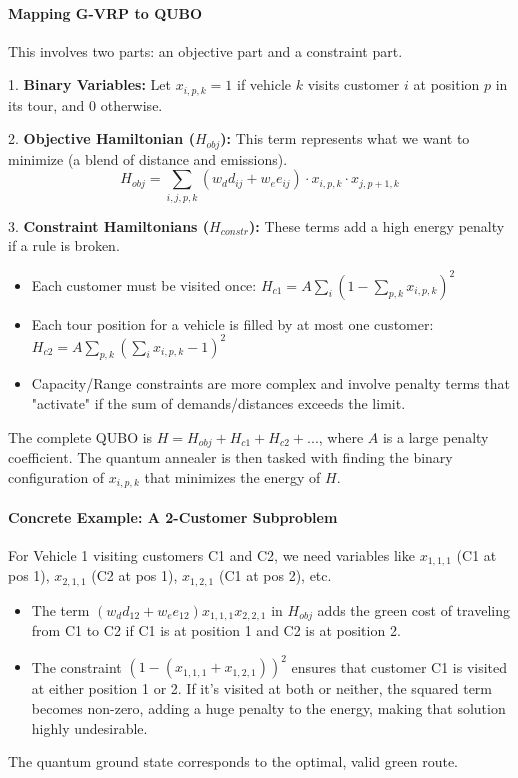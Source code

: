 \documentclass{article}
\begin{document}
\begin{enumerate}
\paragraph{Mapping G-VRP to QUBO}
This involves two parts: an objective part and a constraint part.

1.  \textbf{Binary Variables:} Let $x_{i,p,k} = 1$ if vehicle $k$ visits customer $i$ at position $p$ in its tour, and 0 otherwise.

2.  \textbf{Objective Hamiltonian ($H_{obj}$):} This term represents what we want to minimize (a blend of distance and emissions).
    \begin{equation*}
    H_{obj} = \sum_{i,j,p,k} (w_d d_{ij} + w_e e_{ij}) \cdot x_{i,p,k} \cdot x_{j,p+1,k}
    \end{equation*}

3.  \textbf{Constraint Hamiltonians ($H_{constr}$):} These terms add a high energy penalty if a rule is broken.
    \begin{itemize}
        \item Each customer must be visited once: $H_{c1} = A \sum_i (1 - \sum_{p,k} x_{i,p,k})^2$
        \item Each tour position for a vehicle is filled by at most one customer: $H_{c2} = A \sum_{p,k} (\sum_i x_{i,p,k} - 1)^2$
        \item Capacity/Range constraints are more complex and involve penalty terms that "activate" if the sum of demands/distances exceeds the limit.
    \end{itemize}
The complete QUBO is $H = H_{obj} + H_{c1} + H_{c2} + ...$, where $A$ is a large penalty coefficient. The quantum annealer is then tasked with finding the binary configuration of $x_{i,p,k}$ that minimizes the energy of $H$.

\paragraph{Concrete Example: A 2-Customer Subproblem}
For Vehicle 1 visiting customers C1 and C2, we need variables like $x_{1,1,1}$ (C1 at pos 1), $x_{2,1,1}$ (C2 at pos 1), $x_{1,2,1}$ (C1 at pos 2), etc.
\begin{itemize}
    \item The term $(w_d d_{12} + w_e e_{12})x_{1,1,1}x_{2,2,1}$ in $H_{obj}$ adds the green cost of traveling from C1 to C2 if C1 is at position 1 and C2 is at position 2.
    \item The constraint $(1 - (x_{1,1,1} + x_{1,2,1}))^2$ ensures that customer C1 is visited at either position 1 or 2. If it's visited at both or neither, the squared term becomes non-zero, adding a huge penalty to the energy, making that solution highly undesirable.
\end{itemize}
The quantum ground state corresponds to the optimal, valid green route.


\end{enumerate}
\end{document}
